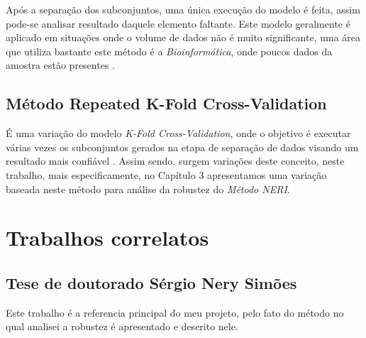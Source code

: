 Após a separação dos subconjuntos, uma única execução do modelo é feita, assim pode-se analisar resultado daquele elemento faltante. Este modelo geralmente é aplicado em situações onde o volume de dados não é muito significante, uma área que utiliza bastante este método é a \textsl{Bioinformática}, onde poucos dados da amostra estão presentes \cite{Mudry2011}. 


\subsection{Método Repeated K-Fold Cross-Validation}

É uma variação do modelo \textsl{K-Fold Cross-Validation}, onde o objetivo é executar várias vezes os subconjuntos gerados na etapa de separação de dados visando um resultado mais confiável \cite{Mudry2011}. Assim sendo, surgem variações deste conceito, neste trabalho, mais especificamente, no Capítulo 3 apresentamos uma variação baseada neste método para análise da robustez do \textsl{Método NERI}.







\section{Trabalhos correlatos}

\subsection{Tese de doutorado Sérgio Nery Simões}
\cite{NERI}
Este trabalho é a referencia principal do meu projeto, pelo fato do método no qual analisei a robustez é apresentado e descrito nele.

